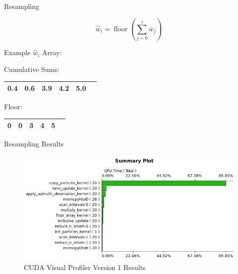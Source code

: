 \documentclass{beamer}
\begin{document}

\begin{frame}{Resampling}

\begin{equation}\label{resample3}
\hat{w}_{i}=\operatorname{floor}(\sum_{j=0}^{i} \overline{w}_{j})
\end{equation}

\vspace{0.5cm}

\begin{center}
Example \(\hat{w}_{i}\) Array:
\end{center}

\renewcommand{\tabcolsep}{0.5cm}

\begin{center}
Cumulative Sums:
\end{center}
\begin{center}
\begin{tabular}{ | c | c | c | c | c | c | }
  \hline
   0.4 & 0.6 & 3.9 & 4.2 & 5.0 \\
  \hline
\end{tabular}
\end{center}

\renewcommand{\tabcolsep}{0.65cm}

\begin{center}
Floor:
\end{center}
\begin{center}
\begin{tabular}{ | c | c | c | c | c | c | }
  \hline
   0 & 0 & 3 & 4 & 5 \\
  \hline
\end{tabular}
\end{center}

\end{frame}


\begin{frame}{Resampling Results}

\begin{figure}
\centering
\includegraphics[width=1.0\textwidth]{data/profile_cuda_version1_pic1.png}
\caption{CUDA Visual Profiler Version 1 Results}
\end{figure}

\end{frame}
\end{document}
